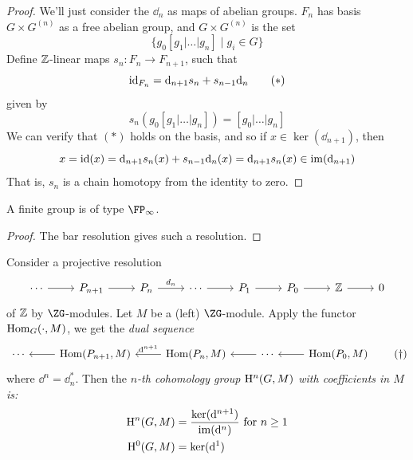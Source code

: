 \documentclass{article}
\begin{document}
\begin{proof}
    We'll just consider the \(\dd_n\) as maps of abelian groups. \(F_n\) has basis \(G \times G^{(n)}\) as a free abelian group, and \(G \times G^{(n)}\) is the set
    \[\{g_0[g_1\vert\dots\vert g_n] \mid g_i \in G\}\]
    Define \(\mathbb{Z}\)-linear maps \(s_n : F_n \to F_{n+1}\), such that
    \[\operatorname{id}_{F_n} = \dd_{n+1}s_n + s_{n-1}\dd_n \tag{\(*\)}\]
    given by
    \[s_n(g_0[g_1\vert\dots\vert g_n]) = [g_0\vert\dots\vert g_n]\]
    We can verify that \((*)\) holds on the basis, and so if \(x \in \ker(\dd_{n+1})\), then
    \[x = \operatorname{id}(x) = \dd_{n+1}s_n(x) + s_{n-1}\dd_n(x) = \dd_{n+1}s_n(x) \in \operatorname{im}(\dd_{n+1})\]
    That is, \(s_n\) is a chain homotopy from the identity to zero.
\end{proof}

\begin{corollary}
    A finite group is of type \(\FP_\infty\).
\end{corollary}

\begin{proof}
    The bar resolution gives such a resolution.
\end{proof}

\lec

\begin{definition}
    Consider a projective resolution
\[\begin{tikzcd}
	\cdots & {P_{n+1}} & {P_n} & \cdots & {P_1} & {P_0} & \Z & 0
	\arrow[from=1-1, to=1-2]
	\arrow[from=1-2, to=1-3]
	\arrow["{d_n}", from=1-3, to=1-4]
	\arrow[from=1-4, to=1-5]
	\arrow[from=1-5, to=1-6]
	\arrow[from=1-6, to=1-7]
	\arrow[from=1-7, to=1-8]
\end{tikzcd}\]
    of \(\mathbb{Z}\) by \(\ZG\)-modules. Let \(M\) be a (left) \(\ZG\)-module. Apply the functor \(\operatorname{Hom}_G(\cdot, M)\), we get the \emph{dual sequence}
\[\begin{tikzcd}
	\cdots & {\Hom(P_{n+1}, M)} & {\Hom(P_n, M)} & \cdots & {\Hom(P_0, M)}
	\arrow[from=1-2, to=1-1]
	\arrow["{\dd^{n+1}}"', from=1-3, to=1-2]
	\arrow[from=1-4, to=1-3]
	\arrow[from=1-5, to=1-4]
\end{tikzcd} \tag{\(\dagger\)}\]
    where \(\dd^n = \dd_n^*\). Then the \emph{\(n\)-th cohomology group \(\mathrm{H}^n(G, M)\) with coefficients in \(M\) is:}
    \begin{align*}
        \mathrm{H}^n(G, M) &= \frac{\ker(\dd^{n+1})}{\operatorname{im}(\dd^n)} \text{ for }n \ge 1 \\
        \mathrm{H}^0(G, M) &= \ker(\dd^1)
    \end{align*}
\end{definition}
\end{document}
